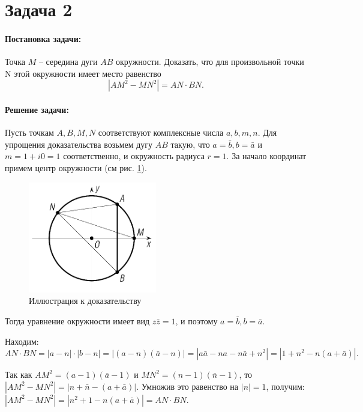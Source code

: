 {
   \section*{Задача 2}
   \paragraph{Постановка задачи:}
   Точка \(M\) -- середина дуги \(AB\) окружности. Доказать, что для произвольной точки N этой
   окружности имеет место
   равенство
   \begin{equation}
      \left\lvert AM^2-MN^2 \right\rvert = AN \cdot BN.
      \label{t2:f1}
   \end{equation}
   \paragraph{Решение задачи:}
   Пусть точкам \(A,B,M,N\) соответствуют комплексные числа \(a,b,m,n\). Для упрощения доказательства
   возьмем дугу \(AB\) такую, что \(a = \bar{b},b = \bar{a}\) и \(m = 1 + i0 = 1\) соответственно, и
   окружность радиуса \(r = 1\). За начало координат примем центр окружности (см рис. \ref{t2:im}).
   \begin{figure}[h]
      \centering
      \includegraphics[width=0.5\textwidth]{images/task2.png}
      \caption{Иллюстрация к доказательству}
      \label{t2:im}
   \end{figure}
   Тогда уравнение окружности имеет
   вид \(z \bar{z}=1\), и поэтому \(a=\bar{b}, b=\bar{a}\).

   Находим:
   \(AN \cdot BN = \left\lvert a-n \right\rvert \cdot \left\lvert b-n \right\rvert
   = \left\lvert (a-n)(\bar{a}-n)\right\rvert
   = \left\lvert a\bar{a} - na - n\bar{a} + n^2 \right\rvert
   = \left\lvert 1 + n^2 - n(a+\bar{a})\right\rvert.\)

   Так как \(AM^2 =(a-1)(\bar{a}-1)\) и \(MN^2 =(n-1)(\bar{n}-1)\), то
   \(\left\lvert AM^2 - MN^2 \right\rvert = \left\lvert n+\bar{n}-(a+\bar{a}) \right\rvert\).
   Умножив это равенство на \(\left\lvert n \right\rvert=1\), получим:
   \(\left\lvert AM^2 - MN^2 \right\rvert = \left\lvert n^2 +1-n(a+\bar{a})\right\rvert = AN \cdot BN\).
}
